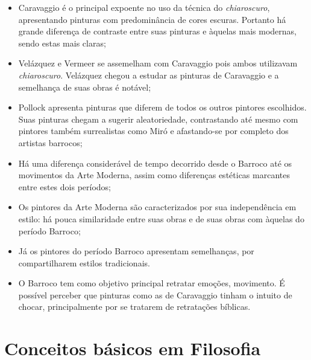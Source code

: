 \begin{itemize}
\item Caravaggio é o principal expoente no uso da técnica do
  \textit{chiaroscuro}, apresentando pinturas com predominância de
  cores escuras. Portanto há grande diferença de contraste entre suas
  pinturas e àquelas mais modernas, sendo estas mais claras;

\item Velázquez e Vermeer se assemelham com Caravaggio pois ambos
  utilizavam \textit{chiaroscuro}. Velázquez chegou a estudar as
  pinturas de Caravaggio e a semelhança de suas obras é notável;

\item Pollock apresenta pinturas que diferem de todos os outros
  pintores escolhidos. Suas pinturas chegam a sugerir aleatoriedade,
  contrastando até mesmo com pintores também surrealistas como Miró e
  afastando-se por completo dos artistas barrocos;

\item Há uma diferença considerável de tempo decorrido desde o Barroco
  até os movimentos da Arte Moderna, assim como diferenças estéticas
  marcantes entre estes dois períodos;

\item Os pintores da Arte Moderna são caracterizados por sua
  independência em estilo: há pouca similaridade entre suas obras e de
  suas obras com àquelas do período Barroco;

\item Já os pintores do período Barroco apresentam semelhanças, por
  compartilharem estilos tradicionais.

\item O Barroco tem como objetivo principal retratar emoções,
  movimento. É possível perceber que pinturas como as de Caravaggio
  tinham o intuito de chocar, principalmente por se tratarem de
  retratações bíblicas.
\end{itemize}

\section{Conceitos básicos em Filosofia}
\label{sec:fund:filosofia}

